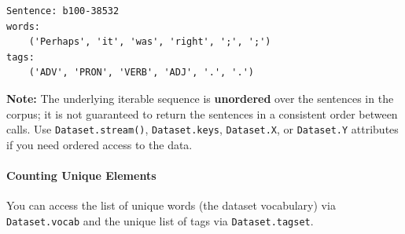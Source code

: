 \documentclass[11pt]{article}
\begin{document}
    \begin{Verbatim}[commandchars=\\\{\}]
Sentence: b100-38532
words:
	('Perhaps', 'it', 'was', 'right', ';', ';')
tags:
	('ADV', 'PRON', 'VERB', 'ADJ', '.', '.')

    \end{Verbatim}

    \textbf{Note:} The underlying iterable sequence is \textbf{unordered}
over the sentences in the corpus; it is not guaranteed to return the
sentences in a consistent order between calls. Use
\texttt{Dataset.stream()}, \texttt{Dataset.keys}, \texttt{Dataset.X}, or
\texttt{Dataset.Y} attributes if you need ordered access to the data.

\hypertarget{counting-unique-elements}{%
\paragraph{Counting Unique Elements}\label{counting-unique-elements}}

You can access the list of unique words (the dataset vocabulary) via
\texttt{Dataset.vocab} and the unique list of tags via
\texttt{Dataset.tagset}.
\end{document}
